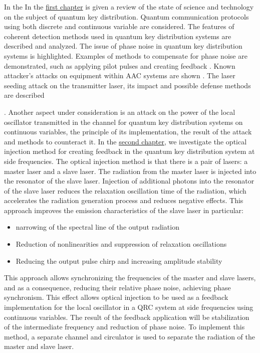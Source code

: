 In the \newline In the \underline{first chapter} is given a review of the state of science and technology on the subject of quantum key distribution. Quantum communication protocols using both discrete\cite{bennett1984,bennett1992,ekert1991,wang2005b} and continuous variable\cite{yuan2005,andersen2010,dixon2010,hajomer2024,diamanti2015} are considered. The features of coherent detection methods\cite{ip2008a} used in quantum key distribution systems are described and analyzed. The issue of phase noise in quantum key distribution systems is highlighted. Examples of methods to compensate for phase noise are demonstrated, such as applying pilot pulses \cite{wang2020} and creating feedback \cite{khaksar2023a}.  Known attacker's attacks on equipment within AAC systems are shown \cite{lydersen2010a,gisin2006, huang2013}. The laser seeding attack on the transmitter laser, its impact and possible defense methods are described{\cite{huang2019,lovic2023,ma2013}. Another aspect under consideration is an attack on the power of the local oscillator transmitted in the channel for quantum key distribution systems on continuous variables, the principle of its implementation, the result of the attack and methods to counteract it\cite{jouguet2013,shao2022,fan2023,ren2019}.
\newline In the \underline{second chapter}, we investigate the optical injection method\cite{shakhovoy2024,liu2020} for creating feedback in the quantum key distribution system at side frequencies\cite{gleim2016,gleim2017,fadeev2024}. The optical injection method is that there is a pair of lasers: a master laser and a slave laser. The radiation from the master laser is injected into the resonator of the slave laser. Injection of additional photons into the resonator of the slave laser reduces the relaxation oscillation time of the radiation, which accelerates the radiation generation process and reduces negative effects. This approach improves the emission characteristics of the slave laser in particular:
\begin{itemize}
    \item narrowing of the spectral line of the output radiation
    \item Reduction of nonlinearities and suppression of relaxation oscillations
    \item Reducing the output pulse chirp and increasing amplitude stability
\end{itemize}
This approach allows synchronizing the frequencies of the master and slave lasers, and as a consequence, reducing their relative phase noise, achieving phase synchronism. This effect allows optical injection to be used as a feedback implementation for the local oscillator in a QRC system at side frequencies using continuous variables. The result of the feedback application will be stabilization of the intermediate frequency and reduction of phase noise. To implement this method, a separate channel and circulator is used to separate the radiation of the master and slave laser. 
}
